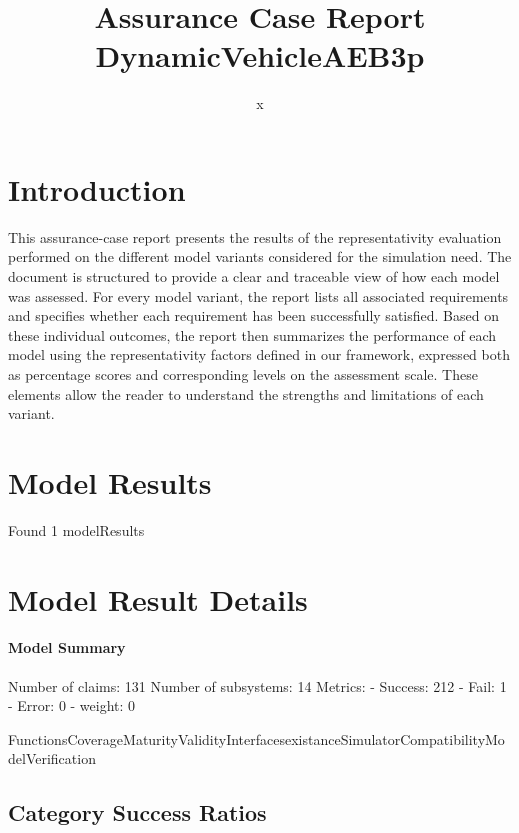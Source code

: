 \documentclass{article}
\title{Assurance Case Report DynamicVehicleAEB3p}
\author{x}
\begin{document}
	\maketitle
	\section{Introduction}
	This assurance-case report presents the results of the 
	representativity evaluation performed on the different model variants considered for 
	the simulation need. The document is structured to provide a clear and traceable view of how 
	each model was assessed. For every model variant, the report lists all associated requirements
	 and specifies whether each requirement has been successfully satisfied. Based on these 
	individual outcomes, the report then summarizes the performance of each model using the 
	representativity factors defined in our framework, expressed both as percentage scores 
	and corresponding levels on the assessment scale. These elements allow the reader to understand 
	the strengths and limitations of each variant.
	 
	\section{Model Results}
    Found 1 modelResults
		
			\section{Model Result Details} 
			\paragraph{Model Summary}
			Number of claims: 131
			Number of subsystems: 14
			Metrics:
			- Success: 212
			- Fail: 1
			- Error: 0
			- weight: 0
			
			FunctionsCoverageMaturityValidityInterfacesexistanceSimulatorCompatibilityModelVerification

					\subsection{Category Success Ratios}
						
\end{document}
